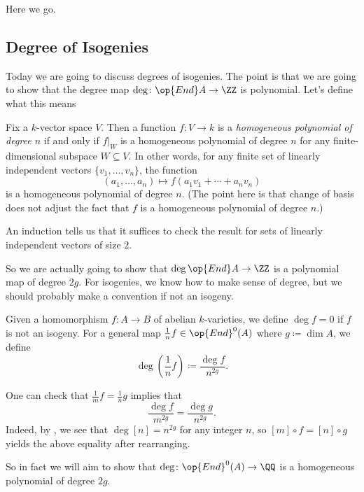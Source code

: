\documentclass[../notes.tex]{subfiles}
\begin{document}
Here we go.

\subsection{Degree of Isogenies}
Today we are going to discuss degrees of isogenies. The point is that we are going to show that the degree map $\deg\colon\op{End}A\to\ZZ$ is polynomial. Let's define what this means
\begin{definition}
	Fix a $k$-vector space $V$. Then a function $f\colon V\to k$ is a \textit{homogeneous polynomial of degree $n$} if and only if $f|_W$ is a homogeneous polynomial of degree $n$ for any finite-dimensional subspace $W\subseteq V$. In other words, for any finite set of linearly independent vectors $\{v_1,\ldots,v_n\}$, the function
	\[(a_1,\ldots,a_n)\mapsto f(a_1v_1+\cdots+a_nv_n)\]
	is a homogeneous polynomial of degree $n$. (The point here is that change of basis does not adjust the fact that $f$ is a homogeneous polynomial of degree $n$.)
\end{definition}
\begin{remark} \label{rem:reduce-poly-map-to-two}
	An induction tells us that it suffices to check the result for sets of linearly independent vectors of size $2$.
\end{remark}
So we are actually going to show that $\deg\op{End}A\to\ZZ$ is a polynomial map of degree $2g$. For isogenies, we know how to make sense of degree, but we should probably make a convention if not an isogeny.
\begin{definition}
	Given a homomorphism $f\colon A\to B$ of abelian $k$-varieties, we define $\deg f=0$ if $f$ is not an isogeny. For a general map $\frac1nf\in\op{End}^0(A)$ where $g\coloneqq\dim A$, we define
	\[\deg\left(\frac1nf\right)\coloneqq\frac{\deg f}{n^{2g}}.\]
\end{definition}
\begin{remark}
	One can check that $\frac1mf=\frac1ng$ implies that
	\[\frac{\deg f}{m^{2g}}=\frac{\deg g}{n^{2g}}.\]
	Indeed, by , we see that $\deg[n]=n^{2g}$ for any integer $n$, so $[m]\circ f=[n]\circ g$ yields the above equality after rearranging.
\end{remark}
So in fact we will aim to show that $\deg\colon\op{End}^0(A)\to\QQ$ is a homogeneous polynomial of degree $2g$.
\end{document}
